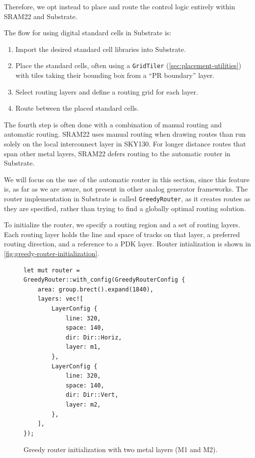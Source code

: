Therefore, we opt instead to place and route the control logic entirely within SRAM22 and Substrate.

The flow for using digital standard cells in Substrate is:
\begin{enumerate}
\item Import the desired standard cell libraries into Substrate.
\item Place the standard cells, often using a \verb|GridTiler| (\ref{sec:placement-utilities}) with tiles taking their bounding box from a ``PR boundary'' layer.
\item Select routing layers and define a routing grid for each layer.
\item Route between the placed standard cells.
\end{enumerate}

The fourth step is often done with a combination of manual routing and automatic routing.
SRAM22 uses manual routing when drawing routes than run solely on the local interconnect layer in SKY130.
For longer distance routes that span other metal layers, SRAM22 defers routing to the automatic router in Substrate.

We will focus on the use of the automatic router in this section, since this feature is, as far as we are aware, not present
in other analog generator frameworks. The router implementation in Substrate is called \verb|GreedyRouter|, as it creates
routes as they are specified, rather than trying to find a globally optimal routing solution.

To initialize the router, we specify a routing region and a set of routing layers. Each routing layer holds the
line and space of tracks on that layer, a preferred routing direction, and a reference to a PDK layer.
Router intialization is shown in \ref{fig:greedy-router-initialization}.

\begin{figure}[H] \centering
\begin{verbatim}
let mut router = GreedyRouter::with_config(GreedyRouterConfig {
    area: group.brect().expand(1840),
    layers: vec![
        LayerConfig {
            line: 320,
            space: 140,
            dir: Dir::Horiz,
            layer: m1,
        },
        LayerConfig {
            line: 320,
            space: 140,
            dir: Dir::Vert,
            layer: m2,
        },
    ],
});
\end{verbatim}
\caption{Greedy router initialization with two metal layers (M1 and M2). \label{fig:precharge-m1-routing-code}}
\end{figure}

